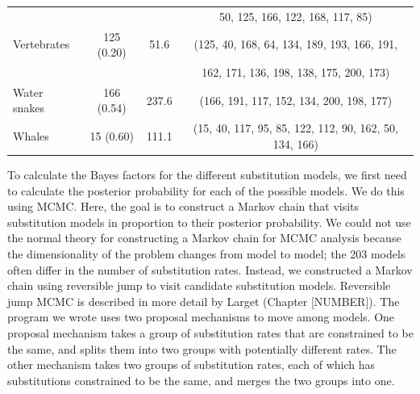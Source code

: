 \documentclass{svmult}
\begin{document}
\begin{table}[b]
\begin{tabular}{l c c c}
                             &            &       & 50, 125, 166, 122, 168, 117, 85) \\
Vertebrates               & 125 (0.20) &  51.6 & (125, 40, 168, 64, 134, 189, 193, 166, 191, \\
                             &            &       & 162, 171, 136, 198, 138, 175, 200, 173) \\ 
Water snakes               & 166 (0.54) & 237.6 & (166, 191, 117, 152, 134, 200, 198, 177) \\ 
Whales                    &  15 (0.60) & 111.1 & (15, 40, 117, 95, 85, 122, 112, 90, 162, 50, 134, 166) \\
\hline
\end{tabular}
\label{tab3}
\end{table}

To calculate the Bayes factors for the different substitution models, we first need to calculate
the posterior probability for each of the possible models. We do this using MCMC.  Here, the goal
is to construct a Markov chain that visits substitution models in proportion to their posterior
probability. We could not use the normal theory for constructing a Markov chain for MCMC analysis
because the dimensionality of the problem changes from model to model; the 203 models often differ
in the number of substitution rates. Instead, we constructed a Markov chain using reversible jump
to visit candidate substitution models. Reversible jump MCMC is described in more detail by Larget
(Chapter [NUMBER]). The program we wrote uses two proposal mechanisms to move among models. One
proposal mechanism takes a group of substitution rates that are constrained to be the same, and
splits them into two groups with potentially different rates. The other mechanism takes two groups
of substitution rates, each of which has substitutions constrained to be the same, and merges the
two groups into one. 
\end{document}
